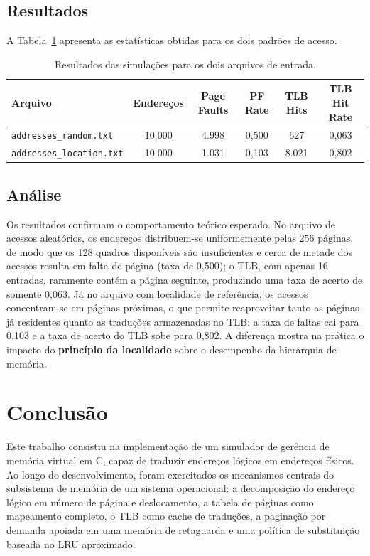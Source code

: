 \documentclass[11pt,a4paper]{article}
\begin{document}
\subsection{Resultados}
A Tabela~\ref{tab:resultados} apresenta as estatísticas obtidas para os dois
padrões de acesso.

\begin{table}[h]
\centering
\begin{tabular}{l c c c c c}
\toprule
\textbf{Arquivo} & \textbf{Endereços} & \textbf{Page Faults} &
\textbf{PF Rate} & \textbf{TLB Hits} & \textbf{TLB Hit Rate} \\
\midrule
\texttt{addresses\_random.txt}   & 10.000 & 4.998 & 0,500 & 627   & 0,063 \\
\texttt{addresses\_location.txt} & 10.000 & 1.031 & 0,103 & 8.021 & 0,802 \\
\bottomrule
\end{tabular}
\caption{Resultados das simulações para os dois arquivos de entrada.}
\label{tab:resultados}
\end{table}

\subsection{Análise}
Os resultados confirmam o comportamento teórico esperado. No arquivo de acessos
aleatórios, os endereços distribuem-se uniformemente pelas 256 páginas, de modo
que os 128 quadros disponíveis são insuficientes e cerca de metade dos acessos
resulta em falta de página (taxa de 0,500); o TLB, com apenas 16 entradas,
raramente contém a página seguinte, produzindo uma taxa de acerto de somente
0,063. Já no arquivo com localidade de referência, os acessos concentram-se em
páginas próximas, o que permite reaproveitar tanto as páginas já residentes
quanto as traduções armazenadas no TLB: a taxa de faltas cai para 0,103 e a taxa
de acerto do TLB sobe para 0,802. A diferença mostra na prática o impacto do
\textbf{princípio da localidade} sobre o desempenho da hierarquia de memória.

\section{Conclusão}
\label{sec:conclusao}

Este trabalho consistiu na implementação de um simulador de gerência de memória
virtual em C, capaz de traduzir endereços lógicos em endereços físicos. Ao longo
do desenvolvimento, foram exercitados os mecanismos centrais do subsistema de
memória de um sistema operacional: a decomposição do endereço lógico em número
de página e deslocamento, a tabela de páginas como mapeamento completo, o TLB
como cache de traduções, a paginação por demanda apoiada em uma memória de
retaguarda e uma política de substituição baseada no LRU aproximado.
\end{document}
